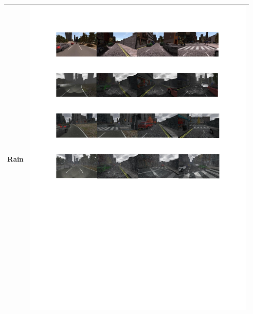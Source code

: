 \documentclass{svproc}
\begin{document}
\begin{table}[!ht]
\begin{tabular}{|C{2.5cm}|C{8.5cm}|}
			Rain &  \begin{minipage}{.9\textwidth}\includegraphics[scale=.5,trim=2cm 16.5cm 2cm 10.5cm,clip]{examples.pdf}\end{minipage} \\ \hline

\end{tabular}
\end{table}
\end{document}
